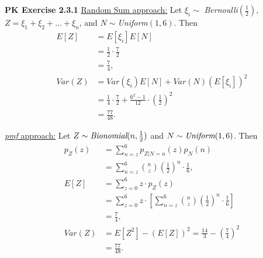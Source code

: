 \documentclass{article}
\begin{document}
\textbf{PK Exercise 2.3.1} 
\underline{Random Sum approach:} Let $\xi_i \sim$ \emph{Bernoulli}$(\frac{1}{2})$, $Z = \xi_1 + \xi_2 + \dots + \xi_n$, and $N \sim $\emph{Uniform}$(1,6)$.
Then 
\begin{align}
    E[Z] & = E[\xi_i]E[N] \nonumber \\
    & = \frac{1}{2}\cdot\frac{7}{2}\nonumber \\
    & =\frac{7}{4}, \nonumber \\
    Var(Z) & = Var(\xi_i)E[N] + Var(N)(E[\xi_i])^2 \nonumber \\
    & = \frac{1}{4}\cdot\frac{7}{2} + \frac{6^2-1}{12}\cdot\left(\frac{1}{2}\right)^2 \nonumber \\
    & = \frac{77}{48}. \nonumber
\end{align}

\underline{\emph{pmf} approach:} Let $Z \sim \emph{Bionomial}(n,\frac{1}{2})$ and $N \sim \emph{Uniform}(1,6)$. 
Then 
\begin{align}
    p_Z(z) & = \sum\limits_{n=z}^6p_{Z|N=n}(z)p_N(n) \nonumber \\
    & = \sum\limits_{n=z}^6{n \choose z}\left(\frac{1}{2}\right)^n\cdot \frac{1}{6}, \nonumber \\
    E[Z] & =\sum\limits_{z=0}^6z\cdot p_Z(z) \nonumber \\
    & = \sum\limits_{z=0}^6z\cdot \left[\sum\limits_{n=z}^6{n \choose z}\left(\frac{1}{2}\right)^n\cdot \frac{1}{6}\right] \nonumber \\
    & = \frac{7}{4}, \nonumber \\
    Var(Z) & = E[Z^2] - (E[Z])^2 = \frac{14}{3} - \left(\frac{7}{4}\right)^2 \nonumber \\
    & = \frac{77}{48}. \nonumber
\end{align}
\end{document}
